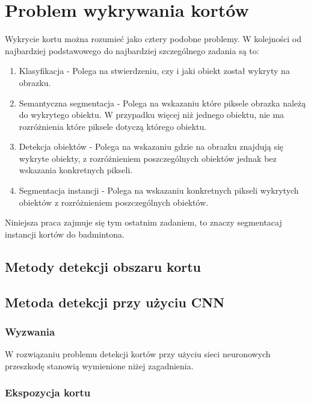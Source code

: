 \chapter{Problem wykrywania kortów}

Wykrycie kortu można rozumieć jako cztery podobne problemy. W kolejności od najbardziej podstawowego do najbardziej szczególnego zadania są to:

\begin{enumerate}
	\item Klasyfikacja - Polega na stwierdzeniu, czy i jaki obiekt został wykryty na obrazku.
	\item Semantyczna segmentacja - Polega na wskazaniu które piksele obrazka należą do wykrytego obiektu. W przypadku więcej niż jednego obiektu, nie ma rozróżnienia które piksele dotyczą którego obiektu.
	\item Detekcja obiektów - Polega na wskazaniu gdzie na obrazku znajdują się wykryte obiekty, z rozróżnieniem poszczególnych obiektów jednak bez wskazania konkretnych pikseli.
	\item Segmentacja instancji - Polega na wskazaniu konkretnych pikseli wykrytych obiektów z rozróżnieniem poszczególnych obiektów.
\end{enumerate}

Niniejsza praca zajmuje się tym ostatnim zadaniem, to znaczy segmentacaj instancji kortów do badmintona.

\section{Metody detekcji obszaru kortu}


\section{Metoda detekcji przy użyciu CNN}

\subsection{Wyzwania}

W rozwiązaniu problemu detekcji kortów przy użyciu sieci neuronowych przeszkodę stanowią wymienione niżej zagadnienia.

\subsection*{Ekspozycja kortu}

